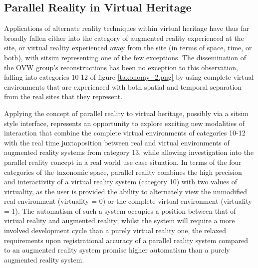 
\subsection{Parallel Reality in Virtual Heritage}

\label{parallel-reality-in-virtual-heritage}


Applications of alternate reality techniques within virtual heritage have thus far broadly fallen either into the category of augmented reality experienced at the site, or virtual reality experienced away from the site (in terms of space, time, or both), with sitsim representing one of the few exceptions. The dissemination of the OVW group's reconstructions has been no exception to this observation, falling into categories 10-12 of figure \ref{taxonomy_2.png} by using complete virtual environments that are experienced with both spatial and temporal separation from the real sites that they represent.

Applying the concept of parallel reality to virtual heritage, possibly via a sitsim style interface, represents an opportunity to explore exciting new modalities of interaction that combine the complete virtual environments of categories 10-12 with the real time juxtaposition between real and virtual environments of augmented reality systems from category 13, while allowing investigation into the parallel reality concept in a real world use case situation. In terms of the four categories of the taxonomic space, parallel reality combines the high precision and interactivity of a virtual reality system (category 10) with two values of virtuality, as the user is provided the ability to alternately view the unmodified real environment (virtuality = 0) or the complete virtual environment (virtuality = 1). The automatism of such a system occupies a position between that of virtual reality and augmented reality; whilst the system will require a more involved development cycle than a purely virtual reality one, the relaxed requirements upon registrational accuracy of a parallel reality system compared to an augmented reality system promise higher automatism than a purely augmented reality system.


